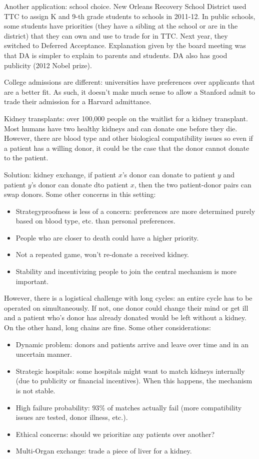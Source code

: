 \documentclass[dvipsnames]{article}
\theoremstyle{definition}
\theoremstyle{remark}
\begin{document}
Another application: school choice. New Orleans Recovery School District used TTC to assign K and 9-th
grade students to schools in 2011-12. In public schools, some students have priorities 
(they have a sibling at the school or are in the district) that they can own and use to trade for in TTC. 
Next year, they switched to Deferred Acceptance. 
Explanation given by the board meeting was that DA is simpler to explain to parents and students. 
DA also has good publicity (2012 Nobel prize). 

College admissions are different: universities have preferences over applicants that are a better fit. 
As such, it doesn't make much sense to allow a Stanford admit to trade their admission for a Harvard admittance. 

Kidney transplants: over 100,000 people on the waitlist for a kidney transplant. Most humans have two healthy kidneys and can donate one before they die. However, there are blood type and other biological compatibility issues so even if a patient has a willing donor, it could be the case that the donor cannot donate to the patient. 

Solution: kidney exchange, if patient $x$'s donor can donate to patient $y$ and patient $y$'s donor can donate 
dto patient $x$, then the two patient-donor pairs can swap donors. Some other concerns in this setting:
\begin{itemize}
	\item Strategyproofness is less of a concern: preferences are more determined purely based on blood type, etc. than personal preferences. 
	\item People who are closer to death could have a higher priority.
	\item Not a repeated game, won't re-donate a received kidney.
	\item Stability and incentivizing people to join the central mechanism is more important.   
\end{itemize}
However, there is a logistical challenge with long cycles: an entire cycle has to be operated on simultaneously. If not, one donor could change their mind or get ill and a patient who's donor has already donated would be left without a kidney. On the other hand, long chains are fine. Some other considerations:
\begin{itemize}
	\item Dynamic problem: donors and patients arrive and leave over time and in an uncertain manner.
	\item Strategic hospitals: some hospitals might want to match kidneys internally (due to publicity or financial incentives). When this happens, the mechanism is not stable.
	\item High failure probability: $93\%$ of matches actually fail (more compatibility issues are tested, donor illness, etc.).
	\item Ethical concerns: should we prioritize any patients over another?
	\item Multi-Organ exchange: trade a piece of liver for a kidney. 
\end{itemize}
\end{document}
